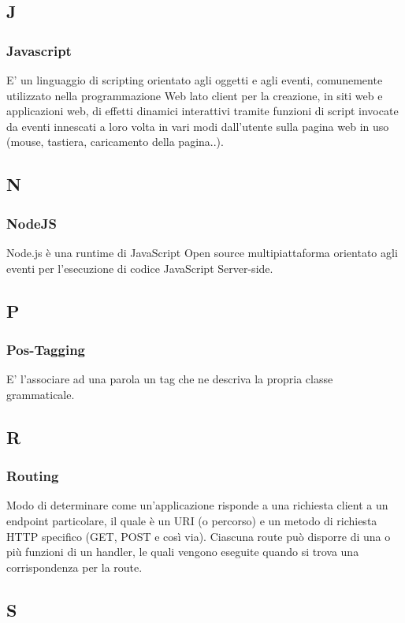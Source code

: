 	\subsection{J}
	\subsubsection{Javascript}
	E' un linguaggio di scripting orientato agli oggetti e agli eventi, comunemente utilizzato nella programmazione Web lato client per la creazione, in siti web e applicazioni web, di effetti dinamici interattivi tramite funzioni di script invocate da eventi innescati a loro volta in vari modi dall'utente sulla pagina web in uso (mouse, tastiera, caricamento della pagina..).
	
		\subsection{N}
	\subsubsection{NodeJS}
	Node.js è una runtime di JavaScript Open source multipiattaforma orientato agli eventi per l'esecuzione di codice JavaScript Server-side.
	
	\subsection{P}
	\subsubsection{Pos-Tagging}
	E' l'associare ad una parola un tag che ne descriva la propria classe grammaticale.
	
	\subsection{R}
	\subsubsection{Routing}
	Modo di determinare come un’applicazione risponde a una richiesta client a un endpoint particolare,
	il quale è un URI (o percorso) e un metodo di richiesta HTTP specifico (GET, POST e così via).
	Ciascuna route può disporre di una o più funzioni di un handler, le quali vengono eseguite quando si
	trova una corrispondenza per la route.
	
	\subsection{S}
